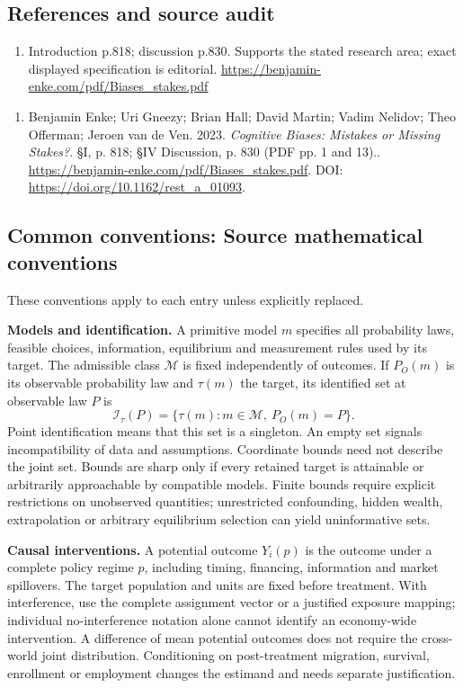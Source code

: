 \documentclass[11pt,a4paper]{article}
\begin{document}
\subsection*{References and source audit}
\begin{enumerate}
\item Introduction p.818; discussion p.830. Supports the stated research area; exact displayed specification is editorial. \url{https://benjamin-enke.com/pdf/Biases_stakes.pdf}
\end{enumerate}
\begin{enumerate}\raggedright
\item\hypertarget{definitions:source:30007584:1}{} Benjamin Enke; Uri Gneezy; Brian Hall; David Martin; Vadim Nelidov; Theo Offerman; Jeroen van de Ven. 2023. \emph{Cognitive Biases: Mistakes or Missing Stakes?}. §I, p. 818; §IV Discussion, p. 830 (PDF pp. 1 and 13)..
\url{https://benjamin-enke.com/pdf/Biases_stakes.pdf}.
DOI: \url{https://doi.org/10.1162/rest_a_01093}.
\end{enumerate}

\subsection*{Common conventions: Source mathematical conventions}

These conventions apply to each entry unless explicitly replaced.

\textbf{Models and identification.} A primitive model \(m\) specifies all probability laws, feasible choices, information, equilibrium and measurement rules used by its target. The admissible class \(\mathcal M\) is fixed independently of outcomes. If \(P_O(m)\) is its observable probability law and \(\tau(m)\) the target, its identified set at observable law \(P\) is
\[
 \mathcal I_\tau(P)=\{\tau(m):m\in\mathcal M,\ P_O(m)=P\}.
\]
Point identification means that this set is a singleton. An empty set signals incompatibility of data and assumptions. Coordinate bounds need not describe the joint set. Bounds are sharp only if every retained target is attainable or arbitrarily approachable by compatible models. Finite bounds require explicit restrictions on unobserved quantities; unrestricted confounding, hidden wealth, extrapolation or arbitrary equilibrium selection can yield uninformative sets.

\textbf{Causal interventions.} A potential outcome \(Y_i(p)\) is the outcome under a complete policy regime \(p\), including timing, financing, information and market spillovers. The target population and units are fixed before treatment. With interference, use the complete assignment vector or a justified exposure mapping; individual no-interference notation alone cannot identify an economy-wide intervention. A difference of mean potential outcomes does not require the cross-world joint distribution. Conditioning on post-treatment migration, survival, enrollment or employment changes the estimand and needs separate justification.
\end{document}

